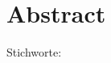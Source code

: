 
\chapter*{Abstract}
\label{cha:Abstract}

\thispagestyle{empty}


\blindtext[2]

\vspace{\fill}

\begin{description}
	\item[Stichworte:] \keywords
\end{description}